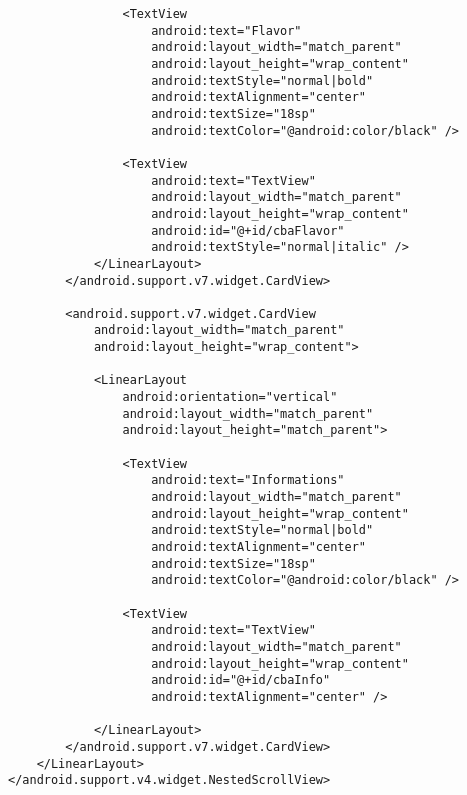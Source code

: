 \begin{lstlisting}
                <TextView
                    android:text="Flavor"
                    android:layout_width="match_parent"
                    android:layout_height="wrap_content"
                    android:textStyle="normal|bold"
                    android:textAlignment="center"
                    android:textSize="18sp"
                    android:textColor="@android:color/black" />

                <TextView
                    android:text="TextView"
                    android:layout_width="match_parent"
                    android:layout_height="wrap_content"
                    android:id="@+id/cbaFlavor"
                    android:textStyle="normal|italic" />
            </LinearLayout>
        </android.support.v7.widget.CardView>

        <android.support.v7.widget.CardView
            android:layout_width="match_parent"
            android:layout_height="wrap_content">

            <LinearLayout
                android:orientation="vertical"
                android:layout_width="match_parent"
                android:layout_height="match_parent">

                <TextView
                    android:text="Informations"
                    android:layout_width="match_parent"
                    android:layout_height="wrap_content"
                    android:textStyle="normal|bold"
                    android:textAlignment="center"
                    android:textSize="18sp"
                    android:textColor="@android:color/black" />

                <TextView
                    android:text="TextView"
                    android:layout_width="match_parent"
                    android:layout_height="wrap_content"
                    android:id="@+id/cbaInfo"
                    android:textAlignment="center" />

            </LinearLayout>
        </android.support.v7.widget.CardView>
    </LinearLayout>
</android.support.v4.widget.NestedScrollView>
\end{lstlisting}

